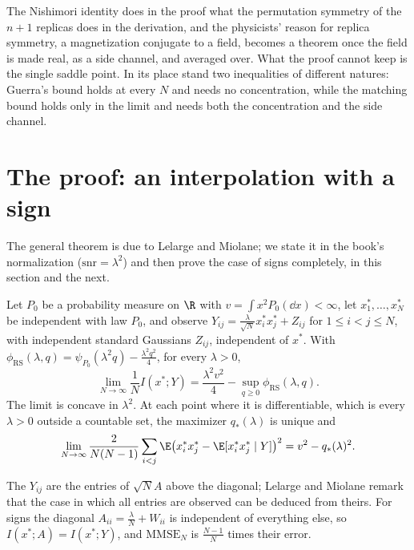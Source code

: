 \begin{refsection}
The Nishimori identity does in the proof what the permutation symmetry of the $n+1$ replicas does in the derivation, and the physicists' reason for replica symmetry, a magnetization conjugate to a field, becomes a theorem once the field is made real, as a side channel, and averaged over. What the proof cannot keep is the single saddle point. In its place stand two inequalities of different natures: Guerra's bound holds at every $N$ and needs no concentration, while the matching bound holds only in the limit and needs both the concentration and the side channel.

\section{The proof: an interpolation with a sign}\label{sec:nishimori:proofguerra}

The general theorem is due to Lelarge and Miolane; we state it in the book's normalization ($\mathrm{snr}=\lambda^2$) and then prove the case of signs completely, in this section and the next.

\begin{theorem}\label{thm:nishimori:rsformula}
Let $P_0$ be a probability measure on $\R$ with $v=\int x^2P_0(\dd x)<\infty$, let $x^*_1,\dots,x^*_N$ be independent with law $P_0$, and observe $Y_{ij}=\frac\lambda{\sqrt N}x^*_ix^*_j+Z_{ij}$ for $1\le i<j\le N$, with independent standard Gaussians $Z_{ij}$, independent of $x^*$. With $\phi_{\mathrm{RS}}(\lambda,q)=\psi_{P_0}(\lambda^2q)-\frac{\lambda^2q^2}4$, for every $\lambda>0$,
\[
\lim_{N\to\infty}\frac1NI(x^*;Y)=\frac{\lambda^2v^2}4-\sup_{q\ge0}\phi_{\mathrm{RS}}(\lambda,q).
\]
The limit is concave in $\lambda^2$. At each point where it is differentiable, which is every $\lambda>0$ outside a countable set, the maximizer $q_*(\lambda)$ is unique and
\[
\lim_{N\to\infty}\frac2{N(N-1)}\sum_{i<j}\E\bigl(x^*_ix^*_j-\E[x^*_ix^*_j\mid Y]\bigr)^2=v^2-q_*(\lambda)^2.
\]
\end{theorem}

The $Y_{ij}$ are the entries of $\sqrt NA$ above the diagonal; Lelarge and Miolane remark that the case in which all entries are observed can be deduced from theirs. For signs the diagonal $A_{ii}=\frac\lambda N+W_{ii}$ is independent of everything else, so $I(x^*;A)=I(x^*;Y)$, and $\mathrm{MMSE}_N$ is $\frac{N-1}N$ times their error.


\end{refsection}
